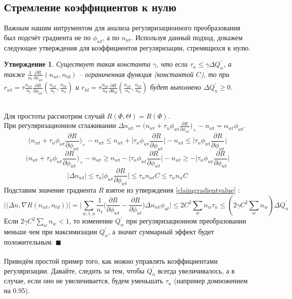 \documentclass[12pt]{article}
\newtheorem{claim}[remark]{Утверждение}
\newenvironment{Proof} 
	{\par\noindent{\bf Доказательство.}} 
	{\hfill$\blacksquare$}
\renewcommand{\leq}{\leqslant}
\renewcommand{\geq}{\geqslant}
\begin{document}
           \subsection{Стремление коэффициентов к нулю}
Важным нашим интрументом для анализа регуляризационного преобразования был подсчёт градиента не по $\phi_{wt}$, а по $n_{wt}$. Используя данный подход, докажем следующее утверждения для коэффициентов регуляризации, стремящихся к нулю.\\
\begin{claim}
Существует такая константа $\gamma$, что если $\tau_n \leq \gamma \Delta Q^{\prime}_n$, а также $\frac{1}{n_t} \frac{\partial{R}}{\partial{\phi_{wt}}}(n_{wt}, n_{td})$ -- ограниченная функция (константой $C$), то при $r_{wt} = \tau \frac{n_{wt}}{n_t} \frac{\partial{R}}{\partial{\phi_{wt}}} \left(\frac{n_{wt}}{n_t}, \frac{n_{td}}{n_d}\right)$ и $r_{td}= \tau \frac{n_{td}}{n_d} \frac{\partial{R}}{\partial{\theta_{td}}} \left(\frac{n_{wt}}{n_t}, \frac{n_{td}}{n_d}\right)$ будет выполнено $\Delta Q^{\prime}_n \geq 0$.
\end{claim}
\begin{Proof}
\ \\
Для простоты рассмотрим случай $R(\Phi, \Theta) = R(\Phi)$. \\
При регуляризационном сглаживании  $\Delta n_{wt} = \bigg( n_{wt} + \tau_n \phi_{wt} \frac{\partial{R}}{\partial{\phi_{wt}}}\bigg)_{+} - n_{wt} = \alpha_{wt} \phi_{wt}$.\\
\[
\bigg( n_{wt} + \tau_n \phi_{wt} \frac{\partial{R}}{\partial{\phi_{wt}}}\bigg)_{+} - n_{wt} \leq  n_{wt} +\bigg| \tau_n \phi_{wt} \frac{\partial{R}}{\partial{\phi_{wt}}}\bigg| - n_{wt} \leq \bigg| \tau_n \phi_{wt} \frac{\partial{R}}{\partial{\phi_{wt}}}\bigg|
\]
\[
\bigg( n_{wt} + \tau_n \phi_{wt} \frac{\partial{R}}{\partial{\phi_{wt}}}\bigg)_{+} - n_{wt} \geq  n_{wt} - \bigg| \tau_n \phi_{wt} \frac{\partial{R}}{\partial{\phi_{wt}}}\bigg| - n_{wt} \geq - \bigg| \tau_n \phi_{wt} \frac{\partial{R}}{\partial{\phi_{wt}}}\bigg|
\]
\[
|\Delta n_{wt} | \leq \tau_n\bigg|  \phi_{wt} \frac{\partial{R}}{\partial{\phi_{wt}}}\bigg| \leq \tau_n n_{wt} C \leq \tau_n n_{w} C
\]
Подставим значение градиента $R$ взятое из утверждения \ref{claimgradientvalue} :
\[
 \bigg|\langle\Delta n, \nabla R(n_{wt}, n_{td}) \rangle\bigg| = \bigg| \sum\limits_{w, t, u}  \frac{1}{n_{t}}  \bigg(  \frac{\partial{R}}{\partial{\phi_{wt}}}  -  \frac{\partial{R}}{\partial{\phi_{ut}}}  \bigg)  \Delta n_{wt}  \phi_{ut} \bigg| \leq 2C^2\sum_w n_w  \tau_n \leq (2 \gamma C^2\sum_w n_w) \Delta Q^{\prime}_n
\]
Если $ 2 \gamma C^2 \sum_w n_w < 1$, то изменение $Q^{\prime}_n$ при регуляризационном преобразовании меньше чем при максимизации $Q^{\prime}_n$, а значит суммарный эффект будет положительным.
\end{Proof}\ \\
\ \\
Приведём простой пример того, как можно управлять коэффициентами регуляризации. Давайте, следить за тем, чтобы $Q^{\prime}_n$ всегда увеличивалось, а в случае, если оно не увеличивается, будем уменьшать $\tau_n$ (например домножением на 0.95).
\end{document}
